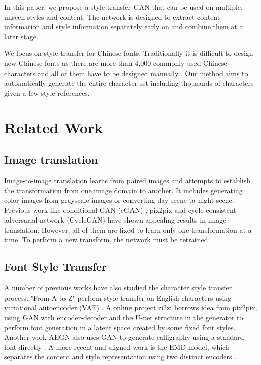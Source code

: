 \documentclass[10pt,twocolumn,letterpaper]{article}
\begin{document}
In this paper, we propose a style transfer GAN that can be used on multiple, unseen styles and content. The network is designed to extract content information and style information separately early on and combine them at a later stage. 

We focus on style transfer for Chinese fonts. Traditionally it is difficult to design new Chinese fonts as there are more than 4,000 commonly used Chinese characters and all of them have to be designed manually \cite{Authors02}. Our method aims to automatically generate the entire character set including thousands of characters given a few style references.

\section{Related Work}

\subsection{Image translation}
Image-to-image translation learns from paired images and attempts to establish the transformation from one image domain to another. It includes generating color images from grayscale images or converting day scene to night scene. Previous work like conditional GAN (cGAN) \cite{Authors01}, pix2pix\cite{DBLP:journals/corr/IsolaZZE16} and cycle-consistent adversarial network (CycleGAN)\cite{DBLP:journals/corr/ZhuPIE17} have shown appealing results in image translation. However, all of them are fixed to learn only one transformation at a time. To perform a new transform, the network must be retrained.

\subsection{Font Style Transfer}
A number of previous works have also studied the character style transfer process. "From A to Z" perform style transfer on English characters using variational autoencoder (VAE) \cite{DBLP:journals/corr/UpchurchSB16}. A online project zi2zi\cite{zi2zi} borrows idea from pix2pix, using GAN with encoder-decoder and the U-net structure in the generator to perform font generation in a latent space created by some fixed font styles. Another work AEGN also uses GAN to generate calligraphy using a standard font directly \cite{DBLP:journals/corr/LyuBYZHL17}. A more recent and aligned work is the EMD model, which separates the content and style representation using two distinct encoders \cite{DBLP:journals/corr/abs-1711-06454}. 
\end{document}
